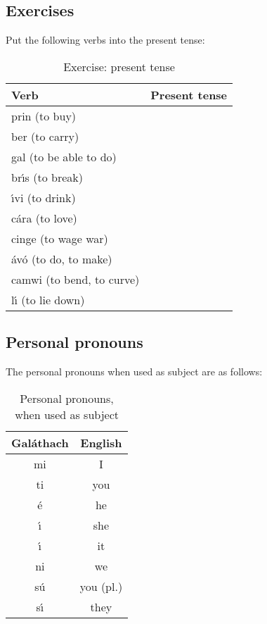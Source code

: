 \subsection{Exercises}
\noindent Put the following verbs into the present tense:
\begin{table}[H]
\begin{center}
\begin{tabu}{|l|p{10.0cm}|}
  \toprule
  \textbf{Verb} & \textbf{Present tense}\\
  \toprule
  prin (to buy) & \\
  \midrule
  ber (to carry) & \\
  \midrule
  gal (to be able to do) & \\
  \midrule
  br\'{\i}s (to break) & \\
  \midrule
  \'{\i}vi (to drink) & \\
  \midrule
  c\'{a}ra (to love) & \\
  \midrule
  cinge (to wage war) & \\
  \midrule
  \'{a}v\'{o} (to do, to make) & \\
  \midrule
  camwi (to bend, to curve) & \\
  \midrule
  l\'{\i} (to lie down) & \\
  \bottomrule
\end{tabu}
\end{center}
\caption{Exercise: present tense}
\label{exercise_present_tense}
\end{table}

\subsection{Personal pronouns}

\noindent The personal pronouns when used as subject are as follows:
\begin{table}[H]
\begin{center}
\begin{tabu}{c|c}
  Gal\'{a}thach & English\\
  \toprule
  mi & I \\
  ti & you\\
  \'{e} & he\\
  \'{\i} & she\\
  \'{\i} & it\\
  ni & we\\
  s\'{u} & you (pl.)\\
  s\'{\i} & they\\
\end{tabu}
\end{center}
\caption{Personal pronouns, when used as subject}
\label{personal_pronouns_as_subject}
\end{table}

